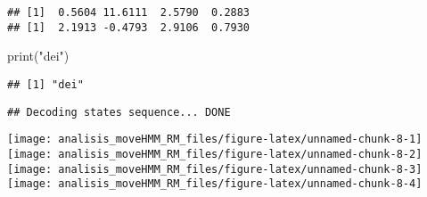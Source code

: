 \documentclass[
]{article}
\newenvironment{Shaded}{\begin{snugshade}}{\end{snugshade}}
\newcommand{\AttributeTok}[1]{\textcolor[rgb]{0.77,0.63,0.00}{#1}}
\newcommand{\ConstantTok}[1]{\textcolor[rgb]{0.00,0.00,0.00}{#1}}
\newcommand{\DecValTok}[1]{\textcolor[rgb]{0.00,0.00,0.81}{#1}}
\newcommand{\FloatTok}[1]{\textcolor[rgb]{0.00,0.00,0.81}{#1}}
\newcommand{\FunctionTok}[1]{\textcolor[rgb]{0.00,0.00,0.00}{#1}}
\newcommand{\NormalTok}[1]{#1}
\newcommand{\SpecialCharTok}[1]{\textcolor[rgb]{0.00,0.00,0.00}{#1}}
\newcommand{\StringTok}[1]{\textcolor[rgb]{0.31,0.60,0.02}{#1}}
\begin{document}
\begin{verbatim}
## [1]  0.5604 11.6111  2.5790  0.2883
## [1]  2.1913 -0.4793  2.9106  0.7930
\end{verbatim}

\begin{Shaded}
\begin{Highlighting}[]
\FunctionTok{print}\NormalTok{(}\StringTok{"dei"}\NormalTok{)}
\end{Highlighting}
\end{Shaded}

\begin{verbatim}
## [1] "dei"
\end{verbatim}

\begin{Shaded}
\end{Shaded}

\begin{verbatim}
## Decoding states sequence... DONE
\end{verbatim}

\texttt{[image: analisis\_moveHMM\_RM\_files/figure-latex/unnamed-chunk-8-1]}
\texttt{[image: analisis\_moveHMM\_RM\_files/figure-latex/unnamed-chunk-8-2]}
\texttt{[image: analisis\_moveHMM\_RM\_files/figure-latex/unnamed-chunk-8-3]}
\texttt{[image: analisis\_moveHMM\_RM\_files/figure-latex/unnamed-chunk-8-4]}

\begin{Shaded}
\end{Shaded}
\end{document}
